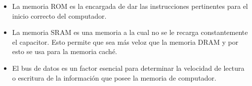 \documentclass{article}
\begin{document}
\begin{itemize}
        \item
            La memoria ROM es la encargada de dar las instrucciones pertinentes para el inicio correcto del computador.
            
        \item
            La memoria SRAM es una memoria a la cual no se le recarga constantemente el capacitor. Esto permite que sea más veloz que la memoria DRAM y por esto se usa para la memoria caché.    
        
        \item
            El bus de datos es un factor esencial para determinar la velocidad de lectura o escritura de la información que posee la memoria de computador.
            
    \end{itemize}




\cite{referencia}
\end{document}
